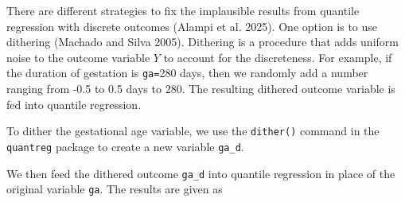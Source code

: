 \documentclass[
  letterpaper,
  DIV=11,
  numbers=noendperiod]{scrartcl}
\newenvironment{Shaded}{\begin{snugshade}}{\end{snugshade}}
\newcommand{\DecValTok}[1]{\textcolor[rgb]{0.68,0.00,0.00}{#1}}
\newcommand{\FloatTok}[1]{\textcolor[rgb]{0.68,0.00,0.00}{#1}}
\newcommand{\FunctionTok}[1]{\textcolor[rgb]{0.28,0.35,0.67}{#1}}
\newcommand{\NormalTok}[1]{\textcolor[rgb]{0.00,0.23,0.31}{#1}}
\newcommand{\OtherTok}[1]{\textcolor[rgb]{0.00,0.23,0.31}{#1}}
\newcommand{\SpecialCharTok}[1]{\textcolor[rgb]{0.37,0.37,0.37}{#1}}
\begin{document}
There are different strategies to fix the implausible results from
quantile regression with discrete outcomes (Alampi et al. 2025). One
option is to use dithering (Machado and Silva 2005). Dithering is a
procedure that adds uniform noise to the outcome variable \(Y\) to
account for the discreteness. For example, if the duration of gestation
is \texttt{ga=}280 days, then we randomly add a number ranging from -0.5
to 0.5 days to 280. The resulting dithered outcome variable is fed into
quantile regression.

To dither the gestational age variable, we use the \texttt{dither()}
command in the \texttt{quantreg} package to create a new variable
\texttt{ga\_d}.

\begin{Shaded}
\end{Shaded}

We then feed the dithered outcome \texttt{ga\_d} into quantile
regression in place of the original variable \texttt{ga}. The results
are given as
\end{document}
